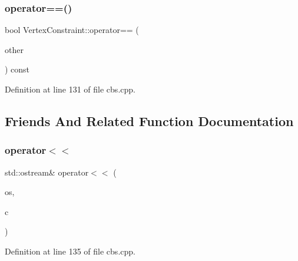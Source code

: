\subsubsection{\texorpdfstring{operator==()}{operator==()}\hspace{0.1cm}{\footnotesize\ttfamily [2/2]}}
{\footnotesize\ttfamily bool Vertex\+Constraint\+::operator== (\begin{DoxyParamCaption}\item[{const \hyperlink{struct_vertex_constraint}{Vertex\+Constraint} \&}]{other }\end{DoxyParamCaption}) const\hspace{0.3cm}{\ttfamily [inline]}}



Definition at line 131 of file cbs.\+cpp.



\subsection{Friends And Related Function Documentation}
\mbox{\label{struct_vertex_constraint_a673f5d8fdc4898875720dddfd6c80e68}} 
\subsubsection{\texorpdfstring{operator$<$$<$}{operator<<}\hspace{0.1cm}{\footnotesize\ttfamily [1/2]}}
{\footnotesize\ttfamily std\+::ostream\& operator$<$$<$ (\begin{DoxyParamCaption}\item[{std\+::ostream \&}]{os,  }\item[{const \hyperlink{struct_vertex_constraint}{Vertex\+Constraint} \&}]{c }\end{DoxyParamCaption})\hspace{0.3cm}{\ttfamily [friend]}}



Definition at line 135 of file cbs.\+cpp.

\mbox{\label{struct_vertex_constraint_a673f5d8fdc4898875720dddfd6c80e68}} 
